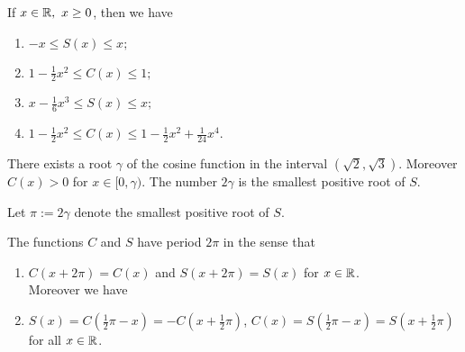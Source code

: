 \begin{theorem}
	If $x \in \mathbb{R},\ x \geq 0$, then we have
	\begin{enumerate}
		\item $-x \leq S(x) \leq x;$
		\item $1-\frac{1}{2}x^2 \leq C(x) \leq 1;$
		\item $x-\frac{1}{6}x^3 \leq S(x) \leq x;$
		\item $1-\frac{1}{2}x^2 \leq C(x) \leq 1-\frac{1}{2}x^2+\frac{1}{24}x^4$.
	\end{enumerate}
\end{theorem}

\begin{lemma}
	There exists a root $\gamma$ of the cosine function in the interval $(\sqrt{2}, \sqrt{3})$. Moreover $C(x) > 0$ for $x \in [0, \gamma)$. The number $2\gamma$ is the smallest positive root of $S$.
\end{lemma}

\begin{definition}
	Let $\pi:=2\gamma$ denote the smallest positive root of $S$.
\end{definition}

\begin{theorem}
	The functions $C$ and $S$ have period $2\pi$ in the sense that
	\begin{enumerate}
		\item $C(x+2\pi)=C(x)$ and $S(x+2\pi) = S(x)$ for $x \in \mathbb{R}$.
		      \\Moreover we have
		\item $S(x)=C(\frac{1}{2}\pi - x) = -C(x+\frac{1}{2}\pi)$, $C(x)=S(\frac{1}{2}\pi-x)=S(x+\frac{1}{2}\pi)$ for all $x \in \mathbb{R}$.
	\end{enumerate}
\end{theorem}
